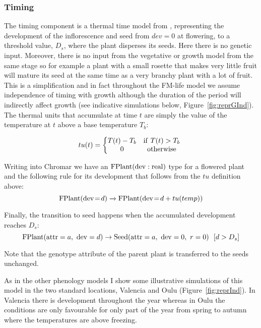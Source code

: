 \subsubsection*{Timing}
\label{timing-1}

The timing component is a thermal time model from
\citet{burghardt_modeling_2015}, representing the development of the
inflorescence and seed from \(dev = 0\) at flowering, to a threshold value,
\(D_{s}\), where the plant disperses its seeds. Here there is no genetic
input. Moreover, there is no input from the vegetative or growth model from the
same stage so for example a plant with a small rosette that makes very little
fruit will mature its seed at the same time as a very branchy plant with a lot
of fruit. This is a simplification and in fact throughout the FM-life model we
assume independence of timing with growth although the duration of the period
will indirectly affect growth (see indicative simulations below,
Figure~\ref{fig:reprGInd}). The thermal units that accumulate at time \(t\) are
simply the value of the temperature at \(t\) above a base temperature \(T_{b}\):

\[tu(t) = \left\{ \begin{matrix}
T(t) - T_{b} & \mathrm{if\ }T(t) > T_{b} \\
0 & \mathrm{otherwise} \\
\end{matrix} \right.\ \]

Writing into Chromar we have an
\(\mathrm{FPlant}(\mathrm{dev}:\mathrm{real})\) type for a flowered plant and
the following rule for its development that follows from the
\(tu\) definition above:
$$
\mathrm{FPlant}( \mathrm{dev} \! = \! {d} ) \xrightarrow{} \mathrm{FPlant}(\mathrm{dev} \! = \! {d + tu(temp)})
$$

Finally, the transition to seed happens when the accumulated development
reaches \(D_{s}\):
\[\mathrm{FPlant}( \mathrm{attr} = a,\mathrm{\ dev} = d ) \rightarrow \mathrm{Seed}( \mathrm{attr} = a,\ \mathrm{dev} = 0,\ r = 0 )\ \ \lbrack d > D_{s}\rbrack\]

Note that the genotype attribute of the parent plant is transferred to
the seeds unchanged.

As in the other phenology models I show some illustrative simulations of this
model in the two standard locations, Valencia and Oulu
(Figure~\ref{fig:reprInd}). In Valencia there is development throughout the year
whereas in Oulu the conditions are only favourable for only part of the year
from spring to autumn where the temperatures are above freezing.

